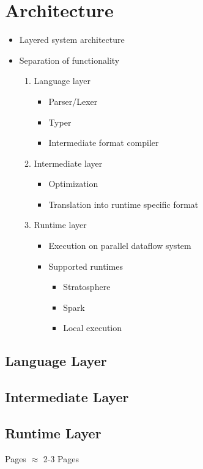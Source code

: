 \chapter{Architecture}
\label{cha:architecture}

\begin{itemize}
	\item Layered system architecture
	\item Separation of functionality
	\begin{enumerate}
		\item Language layer
		\begin{itemize}
			\item Parser/Lexer
			\item Typer
			\item Intermediate format compiler
		\end{itemize}
		\item Intermediate layer
		\begin{itemize}
			\item Optimization
			\item Translation into runtime specific format
		\end{itemize}
		\item Runtime layer
		\begin{itemize}
			\item Execution on parallel dataflow system
			\item Supported runtimes
			\begin{itemize}
				\item Stratosphere
				\item Spark
				\item Local execution
			\end{itemize}
		\end{itemize}
	\end{enumerate}
\end{itemize}

\section{Language Layer}

\section{Intermediate Layer}

\section{Runtime Layer}

Pages $\approx$ 2-3 Pages